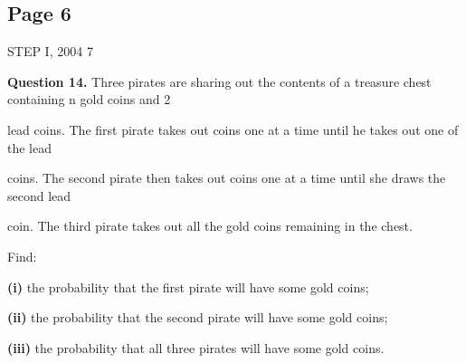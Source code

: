 \documentclass[12pt]{article}
\begin{document}
\subsection*{Page 6}
\begin{flushleft}
STEP I, 2004 7\par
\bigskip\textbf{Question 14.} Three pirates are sharing out the contents of a treasure chest containing n gold coins and 2\par
lead coins. The first pirate takes out coins one at a time until he takes out one of the lead\par
coins. The second pirate then takes out coins one at a time until she draws the second lead\par
coin. The third pirate takes out all the gold coins remaining in the chest.\par
Find:\par
\textbf{(i)} the probability that the first pirate will have some gold coins;\par
\textbf{(ii)} the probability that the second pirate will have some gold coins;\par
\textbf{(iii)} the probability that all three pirates will have some gold coins.\par
\end{flushleft}
\end{document}
